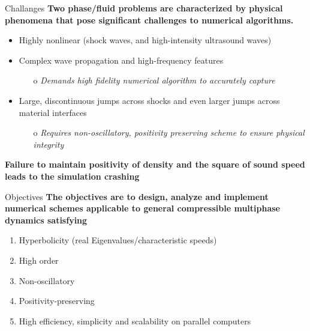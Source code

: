 \documentclass[10pt]{beamer}
\begin{document}
  \begin{frame}{Challanges}
\textbf{Two phase/fluid problems are characterized by physical phenomena that pose significant challenges to numerical algorithms.}
  \begin{itemize}
    \item Highly nonlinear (shock waves, and high-intensity ultrasound waves)
    \item Complex wave propagation and high-frequency features
        \begin{itemize}
          \item[o] \textit{Demands high fidelity numerical algorithm to accurately capture}
        \end{itemize}
    \item Large, discontinuous jumps across shocks and even larger jumps across material interfaces
        \begin{itemize}
          \item[o] \textit{Requires non-oscillatory, positivity preserving scheme to ensure physical integrity}
        \end{itemize}
  \end{itemize}
  \textbf{Failure to maintain positivity of density and the square of sound speed leads to the simulation crashing}  
  \end{frame}

  \begin{frame}{Objectives}
    \textbf{The objectives are to design, analyze and implement numerical schemes applicable to general compressible multiphase dynamics satisfying}
    \begin{enumerate}
      \item Hyperbolicity (real Eigenvalues/characteristic speeds)
      \item High order
      \item Non-oscillatory
      \item Positivity-preserving
      \item High efficiency, simplicity and scalability on parallel
      computers
    \end{enumerate}
  \end{frame}
\end{document}
